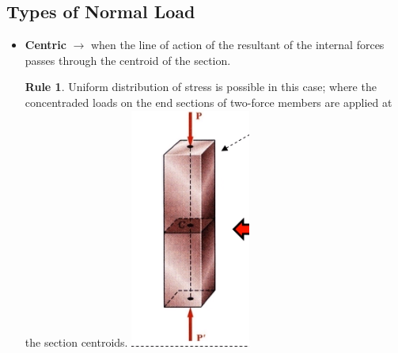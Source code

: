 \documentclass[11pt]{article}
\theoremstyle{definition}
\newtheorem{reg}{Rule}
\begin{document}
\subsection{Types of Normal Load}
\begin{itemize}

	\item \textbf{Centric} $\to$ when the line of action of the resultant of the internal forces passes through the centroid of the section. \begin{reg}
	Uniform distribution of stress is possible in this case; where the concentraded loads on the end sections of two-force members are applied at the section centroids. \includegraphics[scale=0.5]{figures/2021-03-30_22-21.png}
	\end{reg}

\end{itemize}
\end{document}
